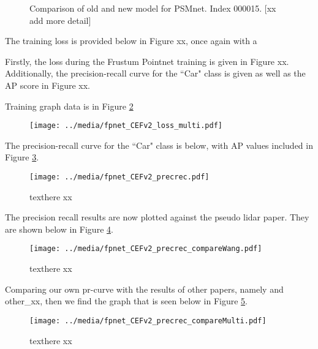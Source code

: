 \begin{figure}[ht]
	\centering
	\caption{Comparison of old and new model for PSMnet. Index 000015. [xx add more detail]}
	\label{new_psmnet}
\end{figure}


The training loss is provided below in Figure xx, once again with a 


Firstly, the loss during the Frustum Pointnet training is given in Figure xx. Additionally, the precision-recall curve for the ``Car" class is given as well as the AP score in Figure xx.

Training graph data is in Figure \ref{fpnet_CEFv2_loss_multi}

\begin{figure}[ht]
	\centering
	\texttt{[image: ../media/fpnet\_CEFv2\_loss\_multi.pdf]}
	\caption{}
	\label{fpnet_CEFv2_loss_multi}
\end{figure}


The precision-recall curve for the ``Car" class is below, with AP values included in Figure \ref{fpnet_CEFv2_precrec}.

\begin{figure}[ht]
	\centering
	\texttt{[image: ../media/fpnet\_CEFv2\_precrec.pdf]}
	\caption{texthere xx}
	\label{fpnet_CEFv2_precrec}
\end{figure}

The precision recall results are now plotted against the pseudo lidar paper. They are shown below in Figure \ref{fpnet_CEFv2_precrec_compareWang}.

\begin{figure}[H]
	\centering
	\texttt{[image: ../media/fpnet\_CEFv2\_precrec\_compareWang.pdf]}
	\caption{texthere xx}
	\label{fpnet_CEFv2_precrec_compareWang}
\end{figure}


Comparing our own pr-curve with the results of other papers, namely \cite{wang_pseudo-lidar_2019} and other\_xx, then we find the graph that is seen below in Figure \ref{fpnet_CEFv2_precrec_compareMulti}.



\begin{figure}[H]
	\centering
	\texttt{[image: ../media/fpnet\_CEFv2\_precrec\_compareMulti.pdf]}
	\caption{texthere xx}
	\label{fpnet_CEFv2_precrec_compareMulti}
\end{figure}

